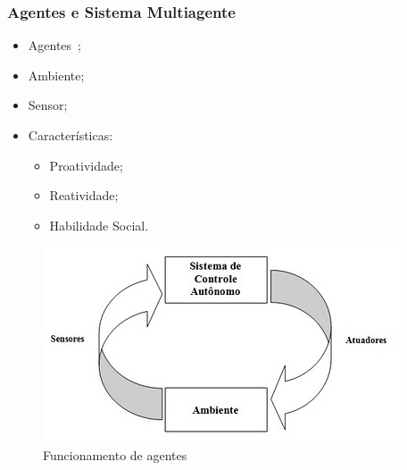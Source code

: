 \documentclass{beamer}
\begin{document}
\begin{frame}
    \frametitle{Agentes e Sistema Multiagente}

	\begin{itemize}
  		\item Agentes~\cite{novig95};
  		\item Ambiente;
  		\item Sensor;
		\item Características:
		\begin{itemize}
  			\item Proatividade;		
	  		\item Reatividade;		 
	  		\item Habilidade Social.	 
		\end{itemize}
	\end{itemize}

    \begin{figure}[h]
    	\centering \includegraphics[scale=0.45]{figuras/agente.jpg}
    	\caption{Funcionamento de agentes~\cite{wooldridge04}}
	\label{agente} 
    \end{figure}
\end{frame}
\end{document}
